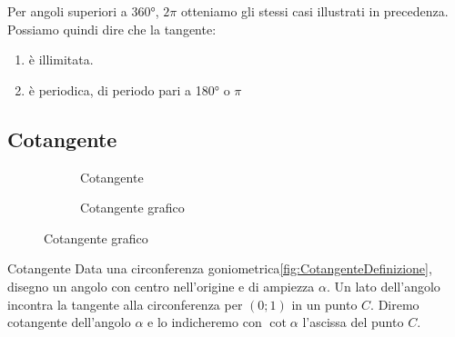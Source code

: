 Per angoli superiori a \ang{360}, $2\pi$ otteniamo gli stessi casi illustrati in precedenza. 
Possiamo quindi dire che la tangente:
\begin{enumerate}
	\item è illimitata.
	\item è periodica, di periodo pari a \ang{180} o $\pi$
\end{enumerate} 
\begin{figure}
	\centering

	\label{fig:AndamentoTangente1}
\end{figure}%
\begin{figure}
	\centering
	
\label{fig:AndamentoTangente2}
\end{figure}%
\subsection{Cotangente}
\label{sec:Cotangente}
\begin{figure}
	\begin{subfigure}[b]{.5\linewidth}
		\centering
		
	\caption{Cotangente}\label{fig:CotangenteDefinizione}
	\end{subfigure}%
	\begin{subfigure}[b]{.5\linewidth}
		\centering
		\caption{Cotangente grafico}\label{fig:CotangenteGrafico}
	\end{subfigure}
	\label{tab:funzcotg}
\end{figure}
%		
\begin{definizionet}{Cotangente}{}
	Data una circonferenza goniometrica\nobs\vref{fig:CotangenteDefinizione}, disegno un angolo con centro nell'origine e di ampiezza $\alpha$. Un lato dell'angolo incontra la tangente alla circonferenza per $(0;1)$ in un punto $C$. Diremo cotangente dell'angolo $\alpha$ e lo indicheremo con $\cot\alpha$ l'ascissa del punto $C$.
\end{definizionet}
